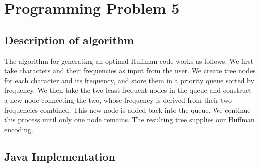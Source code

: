 \documentclass[11pt]{article}
\begin{document}
\section*{Programming Problem 5}

\subsection*{Description of algorithm}

The algorithm for generating an optimal Huffman code works as follows. We first take characters and their frequencies as input from the user. We create tree nodes for each character and its frequency, and store them in a priority queue sorted by frequency. We then take the two least frequent nodes in the queue and construct a new node connecting the two, whose frequency is derived from their two frequencies combined. This new node is added back into the queue. We continue this process until only one node remains. The resulting tree supplies our Huffman encoding.

\subsection*{Java Implementation}
\end{document}
